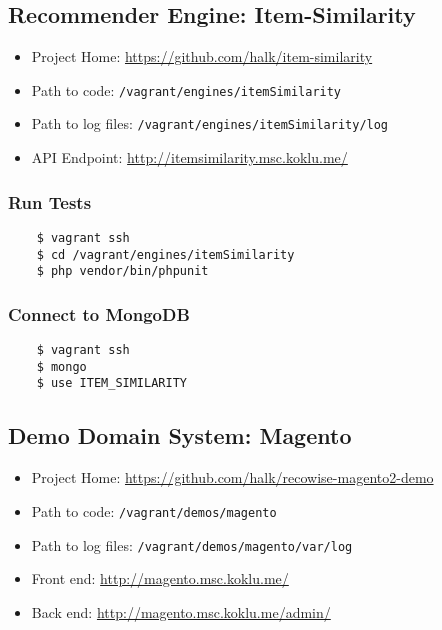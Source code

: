 \subsection{Recommender Engine: Item-Similarity}

\begin{itemize}
\item Project Home: \url{https://github.com/halk/item-similarity}
\item Path to code: \texttt{/vagrant/engines/itemSimilarity}
\item Path to log files: \texttt{/vagrant/engines/itemSimilarity/log}
\item API Endpoint: \url{http://itemsimilarity.msc.koklu.me/}
\end{itemize}

\subsubsection{Run Tests}

\begin{verbatim}
    $ vagrant ssh
    $ cd /vagrant/engines/itemSimilarity
    $ php vendor/bin/phpunit
\end{verbatim}

\subsubsection{Connect to MongoDB}

\begin{verbatim}
    $ vagrant ssh
    $ mongo
    $ use ITEM_SIMILARITY
\end{verbatim}



\subsection{Demo Domain System: Magento}

\begin{itemize}
\item Project Home: \url{https://github.com/halk/recowise-magento2-demo}
\item Path to code: \texttt{/vagrant/demos/magento}
\item Path to log files: \texttt{/vagrant/demos/magento/var/log}
\item Front end: \url{http://magento.msc.koklu.me/}
\item Back end: \url{http://magento.msc.koklu.me/admin/}
\end{itemize}

